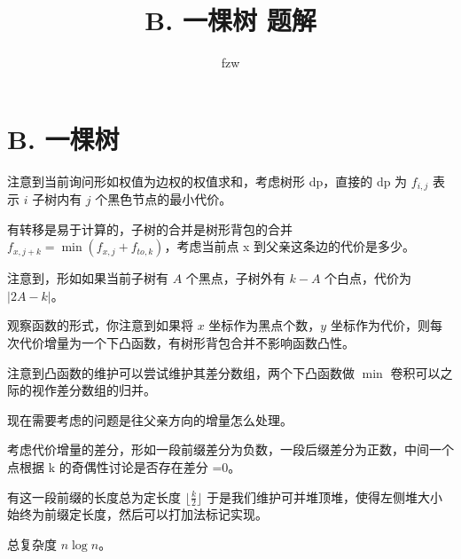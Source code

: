 \documentclass{article}
\title{B. 一棵树 题解}                   %
\author{fzw}
\begin{document}
   \maketitle                                  %
\tableofcontents                               %

\newpage

\section{B. 一棵树}                             %

注意到当前询问形如权值为边权的权值求和，考虑树形 dp，直接的 dp 为 $f_{i,j}$ 表示 $i$ 子树内有 $j$ 个黑色节点的最小代价。

有转移是易于计算的，子树的合并是树形背包的合并 $f_{x,j+k}=\min(f_{x,j}+f_{to,k})$，考虑当前点 x 到父亲这条边的代价是多少。

注意到，形如如果当前子树有 $A$ 个黑点，子树外有 $k-A$ 个白点，代价为 $|2A-k|$。

观察函数的形式，你注意到如果将 $x$ 坐标作为黑点个数，$y$ 坐标作为代价，则每次代价增量为一个下凸函数，有树形背包合并不影响函数凸性。

注意到凸函数的维护可以尝试维护其差分数组，两个下凸函数做 $\min$ 卷积可以之际的视作差分数组的归并。

现在需要考虑的问题是往父亲方向的增量怎么处理。

考虑代价增量的差分，形如一段前缀差分为负数，一段后缀差分为正数，中间一个点根据 k 的奇偶性讨论是否存在差分 =0。

有这一段前缀的长度总为定长度 $\lfloor \frac k 2 \rfloor$ 于是我们维护可并堆顶堆，使得左侧堆大小始终为前缀定长度，然后可以打加法标记实现。

总复杂度 $n\log n$。
\end{document}
